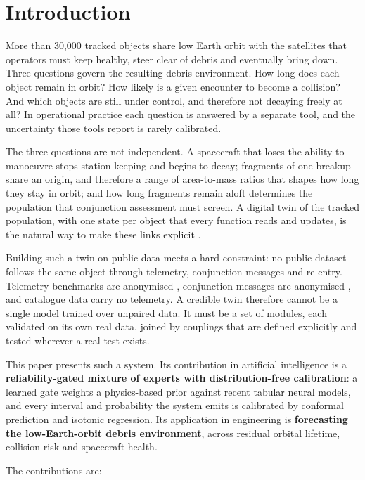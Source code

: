 \documentclass[3p,times,twocolumn]{elsarticle}
\begin{document}
\section{Introduction}\label{sec:intro}

More than 30,000 tracked objects share low Earth orbit with the
satellites that operators must keep healthy, steer clear of debris and
eventually bring down. Three questions govern the resulting debris
environment. How long does each object remain in orbit? How likely is a
given encounter to become a collision? And which objects are still under
control, and therefore not decaying freely at all? In operational
practice each question is answered by a separate tool, and the
uncertainty those tools report is rarely calibrated.

The three questions are not independent. A spacecraft that loses the
ability to manoeuvre stops station-keeping and begins to decay;
fragments of one breakup share an origin, and therefore a range of
area-to-mass ratios that shapes how long they stay in orbit; and how
long fragments remain aloft determines the population that conjunction
assessment must screen. A digital twin of the tracked population, with
one state per object that every function reads and updates, is the
natural way to make these links explicit \citep{liu2024digital}.

Building such a twin on public data meets a hard constraint: no public
dataset follows the same object through telemetry, conjunction messages
and re-entry. Telemetry benchmarks are anonymised
\citep{kotowski2026esaadb, hundman2018}, conjunction messages are
anonymised \citep{uriot2022spacecraft}, and catalogue data carry no
telemetry. A credible twin therefore cannot be a single model trained
over unpaired data. It must be a set of modules, each validated on its
own real data, joined by couplings that are defined explicitly and
tested wherever a real test exists.

This paper presents such a system. Its contribution in artificial
intelligence is a \textbf{reliability-gated mixture of experts with
distribution-free calibration}: a learned gate weights a physics-based
prior against recent tabular neural models, and every interval and
probability the system emits is calibrated by conformal prediction and
isotonic regression. Its application in engineering is
\textbf{forecasting the low-Earth-orbit debris environment}, across
residual orbital lifetime, collision risk and spacecraft health.

The contributions are:
\end{document}
